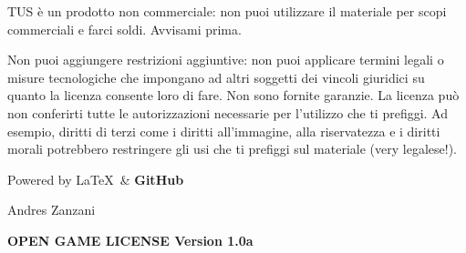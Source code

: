 \documentclass[a4paper,11pt,twoside,openany]{book}
\begin{document}
{\bigskip
TUS è un prodotto non commerciale: non puoi utilizzare il materiale per scopi commerciali e farci soldi. Avvisami prima.

\bigskip
Non puoi aggiungere restrizioni aggiuntive: non puoi applicare termini legali o misure tecnologiche che impongano ad altri soggetti dei vincoli giuridici su quanto la licenza consente loro di fare. Non sono fornite garanzie. La licenza può non conferirti tutte le autorizzazioni necessarie per l'utilizzo che ti prefiggi. Ad esempio, diritti di terzi come i diritti all'immagine, alla riservatezza e i diritti morali potrebbero restringere gli usi che ti prefiggi sul materiale (very legalese!).

\bigskip

Powered by \Large\LaTeX\ \normalfont\& \Large\textbf{GitHub}

\bigskip

Andres Zanzani


\normalsize

\pagebreak

{\footnotesize
\textbf{OPEN GAME LICENSE Version 1.0a}

}}
\end{document}

